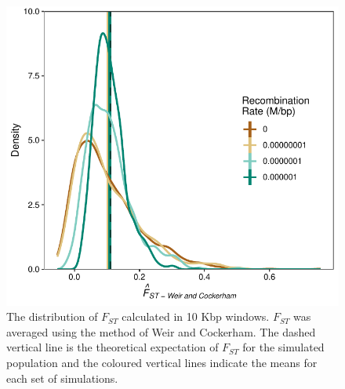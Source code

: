 \documentclass[9pt,twocolumn,twoside]{pnas-new}
\begin{document}
\begin{figure}%
\centering
\includegraphics[width=.8\linewidth]{Fst_plot.pdf}
\caption{The distribution of $F_{ST}$ calculated in 10 Kbp windows. $F_{ST}$ was averaged using the method of Weir and Cockerham. The dashed vertical line is the theoretical expectation of $F_{ST}$ for the simulated population and the coloured vertical lines indicate the means for each set of simulations. }\label{fig:bottom}
\label{fig:Fst}
\end{figure}

\end{document}
